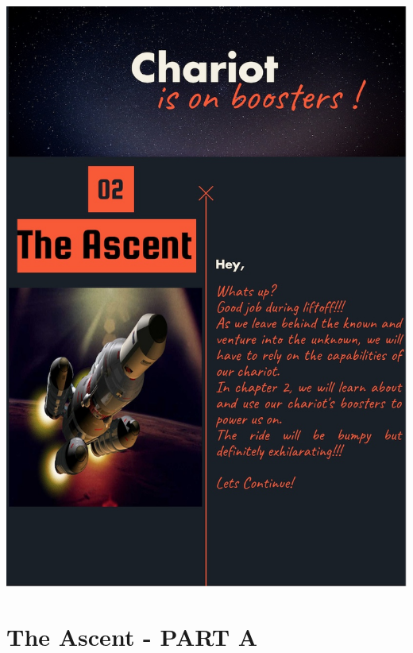 \documentclass[12pt]{book}\usepackage{knitr}
\begin{document}
\cleardoublepage
\thispagestyle{empty}
\includegraphics[width = 17 cm]{./viz/ext/Ascent_A.jpg}

\newpage
\chapter{The Ascent - PART A}



\end{document}
